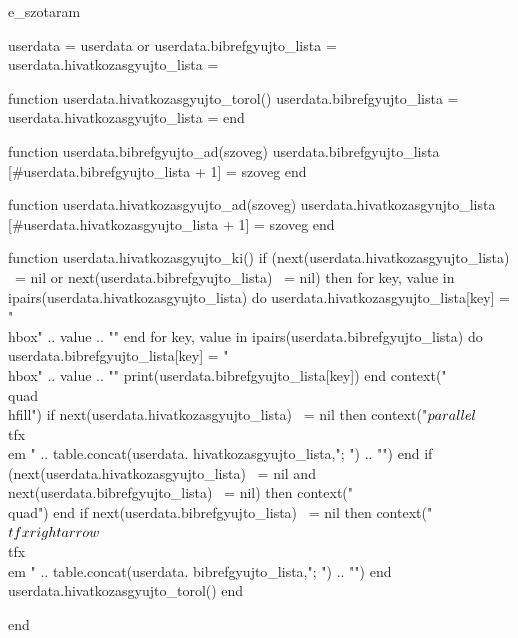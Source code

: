 \startenvironment e_szotaram

\usesymbols[was]

\startluacode

  userdata = userdata or {}
  userdata.bibrefgyujto_lista = {}
  userdata.hivatkozasgyujto_lista = {}

  function userdata.hivatkozasgyujto_torol()
    userdata.bibrefgyujto_lista = {}
    userdata.hivatkozasgyujto_lista = {}
  end

  function userdata.bibrefgyujto_ad(szoveg)
    userdata.bibrefgyujto_lista [#userdata.bibrefgyujto_lista + 1] = szoveg
  end

  function userdata.hivatkozasgyujto_ad(szoveg)
    userdata.hivatkozasgyujto_lista [#userdata.hivatkozasgyujto_lista + 1] = szoveg
  end

  function userdata.hivatkozasgyujto_ki()
    if (next(userdata.hivatkozasgyujto_lista) ~= nil or next(userdata.bibrefgyujto_lista) ~= nil) then
      for key, value in ipairs(userdata.hivatkozasgyujto_lista) do
        userdata.hivatkozasgyujto_lista[key] = "\\hbox{" .. value .. "}"
      end
      for key, value in ipairs(userdata.bibrefgyujto_lista) do
        userdata.bibrefgyujto_lista[key] = "\\hbox{" .. value .. "}"
        print(userdata.bibrefgyujto_lista[key])
      end
      context("\\quad\\hfill")
      if next(userdata.hivatkozasgyujto_lista) ~= nil then
        context("$\\parallel$~{\\tfx\\em " .. table.concat(userdata.  hivatkozasgyujto_lista,"; ") .. "}")
      end
      if (next(userdata.hivatkozasgyujto_lista) ~= nil and next(userdata.bibrefgyujto_lista) ~= nil) then
        context("\\quad")
      end
      if next(userdata.bibrefgyujto_lista) ~= nil then
        context("$\\tfx\\rightarrow$~{\\tfx\\em " .. table.concat(userdata.  bibrefgyujto_lista,"; ") .. "}")
      end
      userdata.hivatkozasgyujto_torol()
    end

  end

\stopluacode




